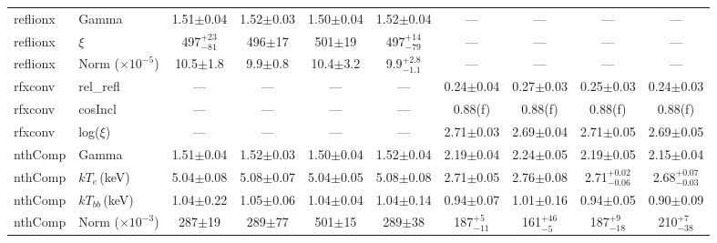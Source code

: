 \documentclass{aa}
\begin{document}
\begin{appendix}
\begin{sidewaystable*}
\begin{tabular}{llcccccccc}
\hline


reflionx & 
Gamma   & 
1.51$\pm$0.04 &
1.52$\pm$0.03 &
1.50$\pm$0.04 &
1.52$\pm$0.04&
--- &
--- &
--- &
--- \\





reflionx & 
$\xi$   & 
497$^{+23}_{-81}$ &
496$\pm$17 &
501$\pm$19 &
497$^{+14}_{-79}$ &
--- &
--- &
--- &
--- \\


reflionx & 
Norm ($\times10^{-5}$)   & 
10.5$\pm$1.8 &
9.9$\pm$0.8 &
10.4$\pm$3.2 &
9.9$^{+2.8}_{-1.1}$ &
--- &
--- &
--- &
--- \\






\hline

rfxconv & 
rel\_refl    & 
--- &
--- &
--- &
--- &
0.24$\pm$0.04 &
0.27$\pm$0.03 &
0.25$\pm$0.03 &
0.24$\pm$0.03 \\



rfxconv & 
cosIncl  & 
---&
--- &
--- &
--- &
0.88(f) &
0.88(f) &
0.88(f) &
0.88(f) \\


rfxconv & 
log($\xi$)   & 
--- &
--- &
--- &
--- &
2.71$\pm$0.03 &
2.69$\pm$0.04 &
2.71$\pm$0.05 &
2.69$\pm$0.05\\

\hline

nthComp &
Gamma   & 
1.51$\pm$0.04 & 
1.52$\pm$0.03  &
1.50$\pm$0.04 &
1.52$\pm$0.04 &
2.19$\pm$0.04 &
2.24$\pm$0.05 &
2.19$\pm$0.05 &
2.15$\pm$0.04\\



nthComp & 
$kT_{e}\,$(keV) & 
5.04$\pm$0.08 &
5.08$\pm$0.07 &
5.04$\pm$0.05 &
5.08$\pm$0.08 &
2.71$\pm$0.05 &
2.76$\pm$0.08 &
2.71$^{+0.02}_{-0.06}$ &
2.68$^{+0.07}_{-0.03}$ \\


  
  
nthComp & 
$kT_{bb}\,$(keV) & 
1.04$\pm$0.22 &
1.05$\pm$0.06 &
1.04$\pm$0.04 &
1.04$\pm$0.14 &
0.94$\pm$0.07 &
1.01$\pm$0.16 &
0.94$\pm$0.05 & 
0.90$\pm$0.09 \\  
 
  
  
  

nthComp & 
Norm ($\times10^{-3}$)   & 
287$\pm$19 &
289$\pm$77&
501$\pm$15 &
289$\pm$38 &
187$^{+5}_{-11}$ &
161$^{+46}_{-5}$ &
187$^{+9}_{-18}$ &
210$^{+7}_{-38}$ \\





\end{tabular}
\end{sidewaystable*}
\end{appendix}
\end{document}
